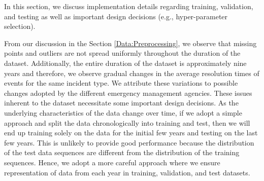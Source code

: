 In this section, we discuss implementation details regarding training, validation, and testing as well as important design   decisions (e.g.,  hyper-parameter selection).



From our discussion in the Section  \ref{Data:Preprocessing}, we observe that missing points and outliers are not spread uniformly throughout the duration of the dataset. Additionally, the entire duration of the dataset is approximately nine years and therefore, we observe gradual changes in the average resolution times of events for the same incident type. We attribute these variations to possible changes adopted by  the different emergency management agencies. These issues inherent to the dataset necessitate some important design decisions. As the underlying characteristics of the data change over time, if we adopt a simple approach and split the data chronologically into training and test, then we will end up training solely on the data for the initial few years and testing on the last few years. This is unlikely to provide good performance because the distribution of the test data sequences are  different from the distribution of the training sequences. Hence, we adopt a more careful approach where we ensure representation of data from each year in training, validation, and test datasets. 


\begin{table}[!ht]
\centering
\resizebox{\columnwidth}{!}{
\begin{tabular}{|c|c|c|c|}%
\hline
\textbf{Sequence Length} &\textbf{Learning Rate} & \textbf{Units in Hidden Layer}\\\hline
10-3	&0.01	&10	\\\hline
10-3	&0.001	&50	\\\hline
10-3	&0.0001	&100\\\hline
15-5	&0.01	&10	\\\hline
15-5	&0.001	&50	\\\hline
15-5	&0.0001	&100\\\hline

\end{tabular}
}
\vspace{3mm}
\caption{Hypararameter combinations for experiments}
\label{tab:hyperparameter}
\end{table}



